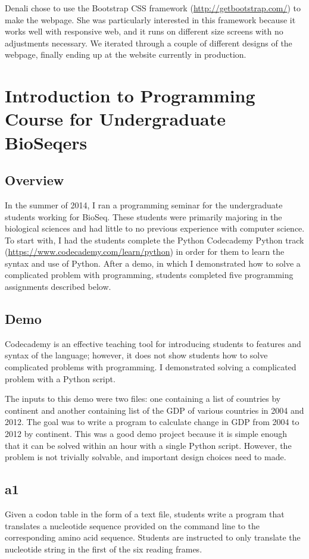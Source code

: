 \documentclass{report}
\begin{document}
Denali chose to use the Bootstrap CSS framework (\url{http://getbootstrap.com/}) to make the webpage. She was particularly interested in this framework because it works well with responsive web, and it runs on different size screens with no adjustments necessary. We iterated through a couple of different designs of the webpage, finally ending up at the website currently in production.

\section{Introduction to Programming Course for Undergraduate BioSeqers}
\subsection{Overview}
In the summer of 2014, I ran a programming seminar for the undergraduate students working for BioSeq. These students were primarily majoring in the biological sciences and had little to no previous experience with computer science. To start with, I had the students complete the Python Codecademy Python track (\url{https://www.codecademy.com/learn/python}) in order for them to learn the syntax and use of Python. After a demo, in which I demonstrated how to solve a complicated problem with programming, students completed five programming assignments described below.

\subsection{Demo}
Codecademy is an effective teaching tool for introducing students to features and syntax of the language; however, it does not show students how to solve complicated problems with programming. I demonstrated solving a complicated problem with a Python script.

The inputs to this demo were two files: one containing a list of countries by continent and another containing list of the GDP of various countries in 2004 and 2012. The goal was to write a program to calculate change in GDP from 2004 to 2012 by continent. This was a good demo project because it is simple enough that it can be solved within an hour with a single Python script. However, the problem is not trivially solvable, and important design choices need to made.

\subsection{a1}
Given a codon table in the form of a text file, students write a program that translates a nucleotide sequence provided on the command line to the corresponding amino acid sequence. Students are instructed to only translate the nucleotide string in the first of the six reading frames.
\end{document}
